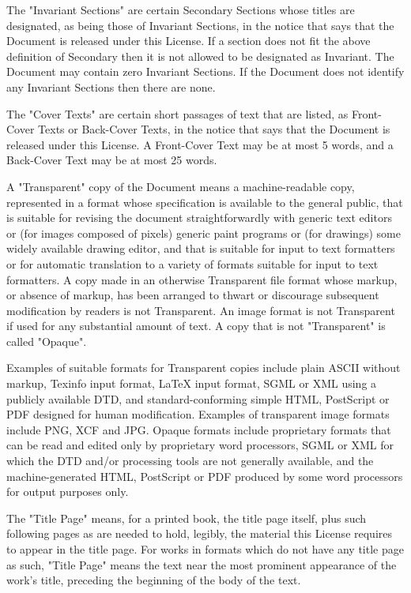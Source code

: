 \documentclass[oneside,12pt]{memoir} %
\begin{document}
The "Invariant Sections" are certain Secondary Sections whose titles are designated, as being those of Invariant Sections, in the notice that says that the Document is released under this License. If a section does not fit the above definition of Secondary then it is not allowed to be designated as Invariant. The Document may contain zero Invariant Sections. If the Document does not identify any Invariant Sections then there are none.

The "Cover Texts" are certain short passages of text that are listed, as Front-Cover Texts or Back-Cover Texts, in the notice that says that the Document is released under this License. A Front-Cover Text may be at most 5 words, and a Back-Cover Text may be at most 25 words.

A "Transparent" copy of the Document means a machine-readable copy, represented in a format whose specification is available to the general public, that is suitable for revising the document straightforwardly with generic text editors or (for images composed of pixels) generic paint programs or (for drawings) some widely available drawing editor, and that is suitable for input to text formatters or for automatic translation to a variety of formats suitable for input to text formatters. A copy made in an otherwise Transparent file format whose markup, or absence of markup, has been arranged to thwart or discourage subsequent modification by readers is not Transparent. An image format is not Transparent if used for any substantial amount of text. A copy that is not "Transparent" is called "Opaque".

Examples of suitable formats for Transparent copies include plain ASCII without markup, Texinfo input format, LaTeX input format, SGML or XML using a publicly available DTD, and standard-conforming simple HTML, PostScript or PDF designed for human modification. Examples of transparent image formats include PNG, XCF and JPG. Opaque formats include proprietary formats that can be read and edited only by proprietary word processors, SGML or XML for which the DTD and/or processing tools are not generally available, and the machine-generated HTML, PostScript or PDF produced by some word processors for output purposes only.

The "Title Page" means, for a printed book, the title page itself, plus such following pages as are needed to hold, legibly, the material this License requires to appear in the title page. For works in formats which do not have any title page as such, "Title Page" means the text near the most prominent appearance of the work's title, preceding the beginning of the body of the text.
\end{document}
